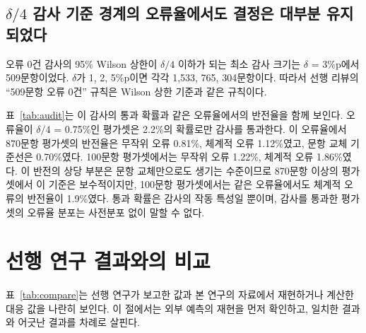 \documentclass[11pt]{article}
\newcommand{\pp}{\%p}
\begin{document}
\subsection{\texorpdfstring{$\delta/4$}{delta/4} 감사 기준 경계의 오류율에서도 결정은 대부분 유지되었다}

\begin{table}[t]
\centering\small\setlength{\tabcolsep}{2.6pt}

\caption{509문항 오류 0건 감사의 통과 확률과 같은 오류율에서의 결정 반전율(모두 \%, $\delta$ = 3\pp{}). 통과 확률은 $(1-e)^{509}$이고, 오류율 0.75\%가 $\delta/4$에 해당한다.}
\label{tab:audit}
\end{table}

오류 0건 감사의 95\% Wilson 상한이 $\delta/4$ 이하가 되는 최소 감사 크기는 $\delta$ = 3\pp{}에서 509문항이었다. $\delta$가 1, 2, 5\pp{}이면 각각 1,533, 765, 304문항이다. 따라서 선행 리뷰의 ``509문항 오류 0건'' 규칙은 Wilson 상한 기준과 같은 규칙이다.

표~\ref{tab:audit}는 이 감사의 통과 확률과 같은 오류율에서의 반전율을 함께 보인다. 오류율이 $\delta/4$ = 0.75\%인 평가셋은 2.2\%의 확률로만 감사를 통과한다. 이 오류율에서 870문항 평가셋의 반전율은 무작위 오류 0.81\%, 체계적 오류 1.12\%였고, 문항 교체 기준선은 0.70\%였다. 100문항 평가셋에서는 무작위 오류 1.22\%, 체계적 오류 1.86\%였다. 이 반전의 상당 부분은 문항 교체만으로도 생기는 수준이므로 870문항 이상의 평가셋에서 이 기준은 보수적이지만, 100문항 평가셋에서는 같은 오류율에서도 체계적 오류의 반전율이 1.9\%였다. 통과 확률은 감사의 작동 특성일 뿐이며, 감사를 통과한 평가셋의 오류율 분포는 사전분포 없이 말할 수 없다.

\section{선행 연구 결과와의 비교}
\label{sec:compare}

\begin{table}[t]
\centering\small\setlength{\tabcolsep}{4pt}

\caption{선행 연구의 보고값과 본 연구의 자료(모델 42종, MMLU-Redux 2.0)에서 재현하거나 계산한 대응 값. 보고값은 각 논문의 본문, 표, 그림에서 옮겼다. 보고값과 본 연구 값은 모델과 과제가 다르므로, 수치의 차이에는 절차 외의 차이도 들어 있다.}
\label{tab:compare}
\end{table}

표~\ref{tab:compare}는 선행 연구가 보고한 값과 본 연구의 자료에서 재현하거나 계산한 대응 값을 나란히 보인다. 이 절에서는 외부 예측의 재현을 먼저 확인하고, 일치한 결과와 어긋난 결과를 차례로 살핀다.
\end{document}
